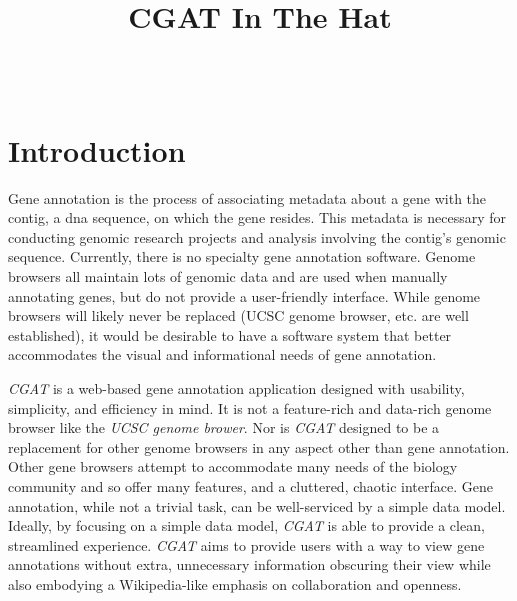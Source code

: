 \documentclass[10pt, conference, compsocconf]{IEEEtran}
\begin{document}
\title{CGAT In The Hat}


\author{
\\
}

\maketitle

\thispagestyle{empty}
\pagestyle{empty}

\section{Introduction}\label{sec:introduction}
Gene annotation is the process of associating metadata about a gene with the
contig, a dna sequence, on which the gene resides.\cite{annotation} This metadata is necessary for conducting
genomic research projects and analysis involving the contig's genomic sequence.
Currently, there is no specialty gene annotation software. Genome browsers
all maintain lots of genomic data and are used when manually annotating genes,
but do not provide a user-friendly interface. While genome browsers
will likely never be replaced (UCSC genome browser, etc. are well
established\cite{ucscbrowser, ncbi}), it would be desirable to have a software system that better
accommodates the visual and informational needs of gene annotation.

\textit{CGAT} is a web-based gene annotation application designed with
usability, simplicity, and efficiency in mind. It is not a feature-rich and data-rich
 genome browser like the \textit{UCSC genome brower}. Nor is \textit{CGAT}
designed to be a replacement for other genome browsers in any aspect other than
gene annotation. Other gene browsers attempt to accommodate many needs of the
biology community and so offer many features, and a cluttered, chaotic
interface. Gene annotation, while not a trivial task, can be well-serviced by a
simple data model. Ideally, by focusing on a simple data model, \textit{CGAT}
is able to provide a clean, streamlined experience. \textit{CGAT} aims to
provide users with a way to view gene annotations without extra, unnecessary
information obscuring their view while also embodying a Wikipedia-like emphasis
on collaboration and openness.
\end{document}
